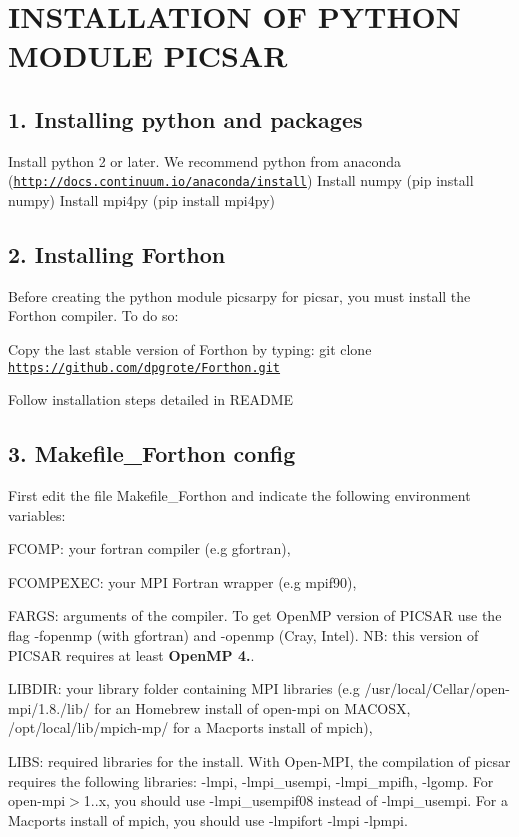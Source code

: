 \section*{I\+N\+S\+T\+A\+L\+L\+A\+T\+I\+ON OF P\+Y\+T\+H\+ON M\+O\+D\+U\+LE P\+I\+C\+S\+AR }

\subsection*{1. Installing python and packages }

Install python 2 or later. We recommend python from anaconda ({\ttfamily \href{http://docs.continuum.io/anaconda/install}{\tt http\+://docs.\+continuum.\+io/anaconda/install}}) Install numpy (pip install numpy) Install mpi4py (pip install mpi4py)

\subsection*{2. Installing Forthon }

Before creating the python module picsarpy for picsar, you must install the Forthon compiler. To do so\+:

Copy the last stable version of Forthon by typing\+: {\ttfamily git clone \href{https://github.com/dpgrote/Forthon.git}{\tt https\+://github.\+com/dpgrote/\+Forthon.\+git}}

Follow installation steps detailed in R\+E\+A\+D\+ME

\subsection*{3. Makefile\+\_\+\+Forthon config }

First edit the file Makefile\+\_\+\+Forthon and indicate the following environment variables\+:


\begin{DoxyItemize}
\item F\+C\+O\+MP\+: your fortran compiler (e.\+g gfortran),
\item F\+C\+O\+M\+P\+E\+X\+EC\+: your M\+PI Fortran wrapper (e.\+g mpif90),
\item F\+A\+R\+GS\+: arguments of the  compiler. To get Open\+MP version of P\+I\+C\+S\+AR use the flag -\/fopenmp (with gfortran) and -\/openmp (Cray, Intel). NB\+: this version of P\+I\+C\+S\+AR requires at least {\bfseries Open\+MP 4.}.
\item L\+I\+B\+D\+IR\+: your library folder containing M\+PI libraries (e.\+g /usr/local/\+Cellar/open-\/mpi/1.8./lib/ for an Homebrew install of open-\/mpi on M\+A\+C\+O\+SX, /opt/local/lib/mpich-\/mp/ for a Macports install of mpich),
\item L\+I\+BS\+: required libraries for the install. With Open-\/\+M\+PI, the compilation of picsar requires the following libraries\+: -\/lmpi, -\/lmpi\+\_\+usempi, -\/lmpi\+\_\+mpifh, -\/lgomp. For open-\/mpi$>$1..\+x, you should use -\/lmpi\+\_\+usempif08 instead of -\/lmpi\+\_\+usempi. For a Macports install of mpich, you should use -\/lmpifort -\/lmpi -\/lpmpi.
\end{DoxyItemize}


